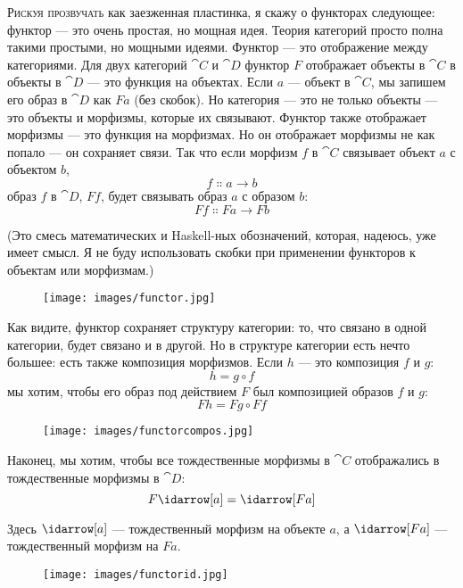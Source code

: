
\lettrine[lhang=0.17]{Р}{искуя прозвучать} как заезженная пластинка, я скажу о функторах следующее: функтор — это очень простая, но мощная идея. Теория категорий просто полна такими простыми, но мощными идеями. Функтор — это отображение между категориями. Для двух категорий $\cat{C}$ и $\cat{D}$ функтор $F$ отображает объекты в $\cat{C}$ в объекты в $\cat{D}$ — это функция на объектах. Если $a$ — объект в $\cat{C}$, мы запишем его образ в $\cat{D}$ как $F a$ (без скобок). Но категория — это не только объекты — это объекты и морфизмы, которые их связывают. Функтор также отображает морфизмы — это функция на морфизмах. Но он отображает морфизмы не как попало — он сохраняет связи. Так что если морфизм $f$ в $\cat{C}$ связывает объект $a$ с объектом $b$,
\[f \Colon a \to b\]
образ $f$ в $\cat{D}$, $F f$, будет связывать образ $a$ с образом $b$:
\[F f \Colon F a \to F b\]

(Это смесь математических и Haskell-ных обозначений, которая, надеюсь, уже имеет смысл. Я не буду использовать скобки при применении функторов к объектам или морфизмам.)

\begin{figure}[H]
  \centering\texttt{[image: images/functor.jpg]}
\end{figure}

\noindent
Как видите, функтор сохраняет структуру категории: то, что связано в одной категории, будет связано и в другой. Но в структуре категории есть нечто большее: есть также композиция морфизмов. Если $h$ — это композиция $f$ и $g$:
\[h = g \circ f\]
мы хотим, чтобы его образ под действием $F$ был композицией образов $f$ и $g$:
\[F h = F g \circ F f\]

\begin{figure}[H]
  \centering
  \texttt{[image: images/functorcompos.jpg]}
\end{figure}

\noindent
Наконец, мы хотим, чтобы все тождественные морфизмы в $\cat{C}$ отображались в тождественные морфизмы в $\cat{D}$:
\[F \idarrow[a] = \idarrow[F a]\]

\noindent
Здесь $\idarrow[a]$ — тождественный морфизм на объекте $a$, а $\idarrow[F a]$ — тождественный морфизм на $F a$.

\begin{figure}[H]
  \centering
  \texttt{[image: images/functorid.jpg]}
\end{figure}

